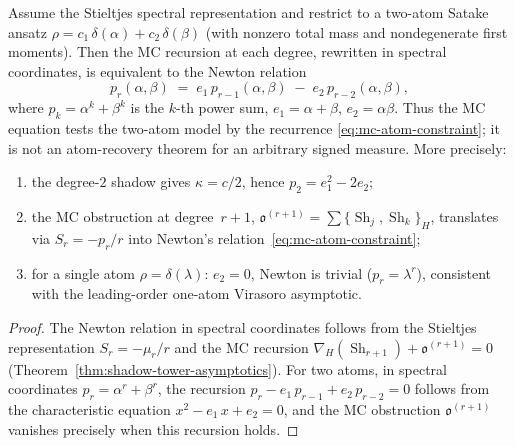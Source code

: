 \begin{proposition}%
\label{prop:mc-bracket-determines-atoms}%
\ClaimStatusProvedHere%
Assume the Stieltjes spectral representation and restrict to a
two-atom Satake ansatz
$\rho = c_1\,\delta(\alpha) + c_2\,\delta(\beta)$
\textup{(}with nonzero total mass and nondegenerate first moments\textup{)}.
Then the MC recursion at each degree, rewritten in spectral
coordinates, is equivalent to the Newton
relation
\begin{equation}\label{eq:mc-atom-constraint}
 p_r(\alpha,\beta)
 \;=\;
 e_1\,p_{r-1}(\alpha,\beta)
 \;-\;
 e_2\,p_{r-2}(\alpha,\beta),
\end{equation}
where $p_k = \alpha^k + \beta^k$ is the $k$-th power sum,
$e_1 = \alpha + \beta$, $e_2 = \alpha\beta$.
Thus the MC equation tests the two-atom model by the recurrence
\eqref{eq:mc-atom-constraint}; it is not an atom-recovery theorem for
an arbitrary signed measure. More precisely:
\begin{enumerate}[label=\textup{(\roman*)}]
\item
the degree-$2$ shadow gives $\kappa = c/2$, hence
$p_2 = e_1^2 - 2e_2$;
\item
the MC obstruction at degree~$r{+}1$,
$\mathfrak{o}^{(r+1)} =
\sum\{\operatorname{Sh}_j, \operatorname{Sh}_k\}_H$,
translates via $S_r = -p_r/r$ into Newton's
relation~\eqref{eq:mc-atom-constraint};
\item
for a single atom $\rho = \delta(\lambda)$:
$e_2 = 0$, Newton is trivial ($p_r = \lambda^r$),
consistent with the leading-order one-atom Virasoro asymptotic.
\end{enumerate}
\end{proposition}

\begin{proof}
The Newton relation in spectral coordinates
follows from the Stieltjes representation
$S_r = -\mu_r/r$ and the MC recursion
$\nabla_H(\operatorname{Sh}_{r+1}) + \mathfrak{o}^{(r+1)} = 0$
(Theorem~\ref{thm:shadow-tower-asymptotics}). For two atoms,
in spectral coordinates $p_r = \alpha^r + \beta^r$,
the recursion $p_r - e_1\,p_{r-1} + e_2\,p_{r-2} = 0$
follows from the characteristic equation
$x^2 - e_1\,x + e_2 = 0$,
and the MC obstruction $\mathfrak{o}^{(r+1)}$ vanishes
precisely when this recursion holds.
\end{proof}

